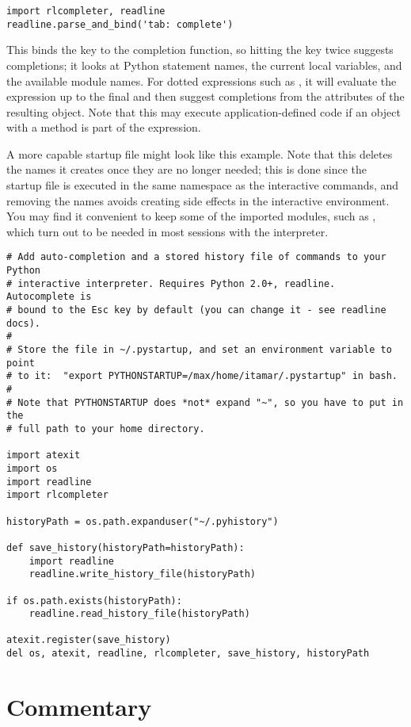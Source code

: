 \documentclass{manual}
\begin{document}
\begin{verbatim}
import rlcompleter, readline
readline.parse_and_bind('tab: complete')
\end{verbatim}

This binds the  key to the completion function, so hitting
the  key twice suggests completions; it looks at Python
statement names, the current local variables, and the available module
names.  For dotted expressions such as , it will
evaluate the expression up to the final  and then
suggest completions from the attributes of the resulting object.  Note
that this may execute application-defined code if an object with a
 method is part of the expression.

A more capable startup file might look like this example.  Note that
this deletes the names it creates once they are no longer needed; this
is done since the startup file is executed in the same namespace as
the interactive commands, and removing the names avoids creating side
effects in the interactive environment.  You may find it convenient
to keep some of the imported modules, such as
, which turn
out to be needed in most sessions with the interpreter.

\begin{verbatim}
# Add auto-completion and a stored history file of commands to your Python
# interactive interpreter. Requires Python 2.0+, readline. Autocomplete is
# bound to the Esc key by default (you can change it - see readline docs).
#
# Store the file in ~/.pystartup, and set an environment variable to point
# to it:  "export PYTHONSTARTUP=/max/home/itamar/.pystartup" in bash.
#
# Note that PYTHONSTARTUP does *not* expand "~", so you have to put in the
# full path to your home directory.

import atexit
import os
import readline
import rlcompleter

historyPath = os.path.expanduser("~/.pyhistory")

def save_history(historyPath=historyPath):
    import readline
    readline.write_history_file(historyPath)

if os.path.exists(historyPath):
    readline.read_history_file(historyPath)

atexit.register(save_history)
del os, atexit, readline, rlcompleter, save_history, historyPath
\end{verbatim}


\section{Commentary \label{commentary}}
\end{document}
